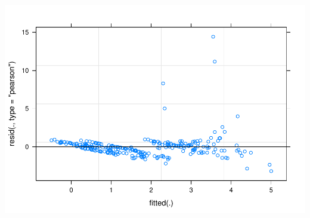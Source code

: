\documentclass[
  12pt,
]{article}
\begin{document}
\includegraphics{project_draft_files/figure-latex/unnamed-chunk-4-6.pdf}
\end{document}
